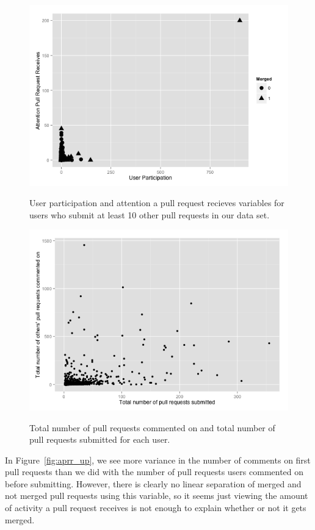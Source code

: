 \documentclass{iitthesis}
\begin{document}
\begin{figure}[p] \centering \label{fig:aprr_up_repeaters_10}
\includegraphics[scale=0.6]{figures/aprr_up_repeaters_10_ggplot.png}
\caption{User participation and attention a pull request recieves variables for
users who submit at least 10 other pull requests in our data set.} \end{figure}

\begin{figure}[p] \centering \label{fig:commented_pullrequests_totals}
\includegraphics[scale=0.6]{figures/commented_pullrequests_totals_ggplot.png}
\caption{Total number of pull requests commented on and total number of pull
requests submitted for each user.} \end{figure}

In Figure~\ref{fig:aprr_up}, we see more variance in the number of comments on
first pull requests than we did with the number of pull requests users commented
on before submitting. However, there is clearly no linear separation of merged
and not merged pull requests using this variable, so it seems just viewing the
amount of activity a pull request receives is not enough to explain whether or
not it gets merged.
\end{document}
